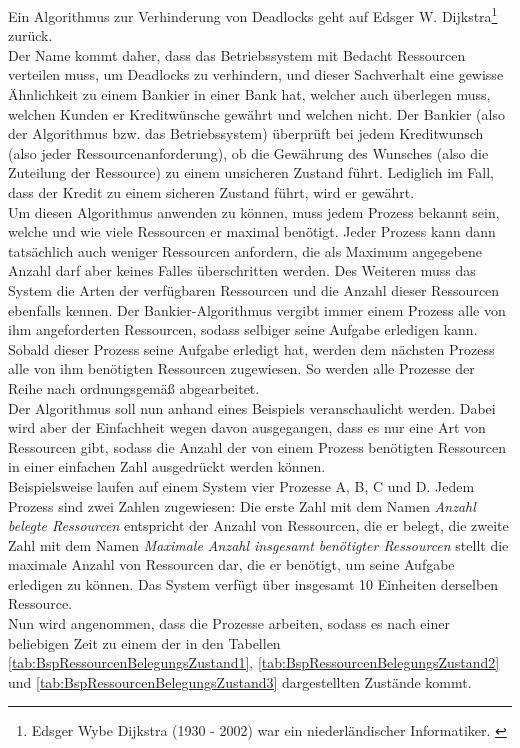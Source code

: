 \begin{description}
\begin{description}
								Ein Algorithmus zur Verhinderung von Deadlocks geht auf Edsger W. Dijkstra\footnote{Edsger Wybe Dijkstra (1930 - 2002) war ein niederländischer Informatiker. \cite{DijkstraWikipedia}} zurück.\\
								Der Name kommt daher, dass das Betriebssystem mit Bedacht Ressourcen verteilen muss, um Deadlocks zu verhindern, und dieser Sachverhalt eine gewisse Ähnlichkeit zu einem Bankier in einer Bank hat, welcher auch überlegen muss, welchen Kunden er Kreditwünsche gewährt und welchen nicht. Der Bankier (also der Algorithmus bzw. das Betriebssystem) überprüft bei jedem Kreditwunsch (also jeder Ressourcenanforderung), ob die Gewährung des Wunsches (also die Zuteilung der Ressource) zu einem unsicheren Zustand führt. Lediglich im Fall, dass der Kredit zu einem sicheren Zustand führt, wird er gewährt. \cite{BankieralgorithmusWikipedia}\\
								Um diesen Algorithmus anwenden zu können, muss jedem Prozess bekannt sein, welche und wie viele Ressourcen er maximal benötigt. Jeder Prozess kann dann tatsächlich auch weniger Ressourcen anfordern, die als Maximum angegebene Anzahl darf aber keines Falles überschritten werden. Des Weiteren muss das System die Arten der verfügbaren Ressourcen und die Anzahl dieser Ressourcen ebenfalls kennen. Der Bankier-Algorithmus vergibt immer einem Prozess alle von ihm angeforderten Ressourcen, sodass selbiger seine Aufgabe erledigen kann. Sobald dieser Prozess seine Aufgabe erledigt hat, werden dem nächsten Prozess alle von ihm benötigten Ressourcen zugewiesen. So werden alle Prozesse der Reihe nach ordnungsgemäß abgearbeitet.\\
								Der Algorithmus soll nun anhand eines Beispiels veranschaulicht werden. Dabei wird aber der Einfachheit wegen davon ausgegangen, dass es nur eine Art von Ressourcen gibt, sodass die Anzahl der von einem Prozess benötigten Ressourcen in einer einfachen Zahl ausgedrückt werden können.\\
								Beispielsweise laufen auf einem System vier Prozesse A, B, C und D. Jedem Prozess sind zwei Zahlen zugewiesen: Die erste Zahl mit dem Namen \textit{Anzahl belegte Ressourcen} entspricht der Anzahl von Ressourcen, die er belegt, die zweite Zahl mit dem Namen \textit{Maximale Anzahl insgesamt benötigter Ressourcen} stellt die maximale Anzahl von Ressourcen dar, die er benötigt, um seine Aufgabe erledigen zu können. Das System verfügt über insgesamt 10 Einheiten derselben Ressource.\\
								Nun wird angenommen, dass die Prozesse arbeiten, sodass es nach einer beliebigen Zeit zu einem der in den Tabellen \ref{tab:BspRessourcenBelegungsZustand1}, \ref{tab:BspRessourcenBelegungsZustand2} und \ref{tab:BspRessourcenBelegungsZustand3} dargestellten Zustände kommt.\\

\end{description}
\end{description}
